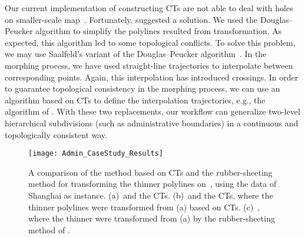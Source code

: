 Our current implementation of constructing CTs 
are not able to deal with holes on smaller-scale map~\ms.
Fortunately, \textcite{BabikovSW97} suggested a solution.
We used the Douglas--Peucker algorithm to simplify the
polylines resulted from transformation.  
As expected, this algorithm led to some topological conflicts.
To solve this problem, we may use Saalfeld's variant of the 
Douglas--Peucker algorithm~\parencite{Saalfeld1999}.
In the morphing process, 
we have used straight-line trajectories 
to interpolate between corresponding points.
Again, this interpolation has introduced crossings.
In order to guarantee topological consistency 
in the morphing process,
we can use an algorithm based on CTs
to define the interpolation trajectories, 
e.g., the algorithm of \textcite{GotsmanS2001}. 
With these two replacements, our workflow can
generalize two-level hierarchical subdivisions 
(such as administrative boundaries) 
in a continuous and topologically consistent way.

\begin{figure}[tb]
\centering
\texttt{[image: Admin\_CaseStudy\_Results]}
\caption{A comparison of the method based on CTs and 
	the rubber-sheeting method 
	for	transforming the thinner polylines on~\ml, 
	using the data of Shanghai as instance. 
	(a)~\ml and the CTs. 
	(b)~\ms and the CTs, where the thinner polylines 
	were transformed from (a) based on CTs.
	(c)~\ms, where the thinner were transformed from (a) 
	by the rubber-sheeting method
	of \textcite{Doytsher2001}.} 
\label{fig:Admin_CT-RS-Comarison-shanghai}
\end{figure}






